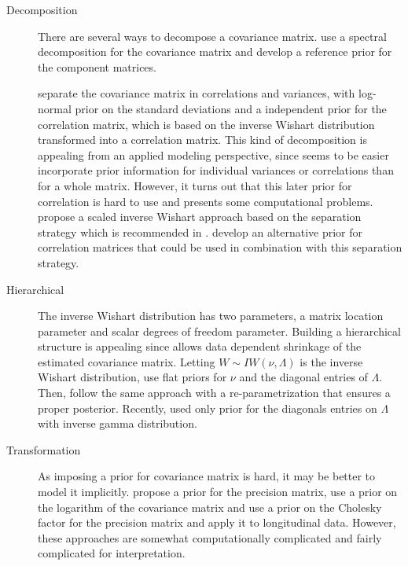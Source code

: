 \documentclass{article}
\begin{document}
\begin{description}
\item[Decomposition] There are several ways to decompose a covariance matrix.  \cite{yang1994} use a spectral decomposition for the covariance matrix and develop a reference prior for the component matrices. 

\cite{barnard2000} separate the covariance matrix in correlations and variances, with log-normal prior on the standard deviations and a independent prior for the correlation matrix, which is based on the inverse Wishart distribution transformed into a correlation matrix. This kind of decomposition is appealing from an applied modeling perspective, since seems to be easier incorporate prior information for individual variances or correlations than for a whole matrix. However, it turns out that this later prior for correlation is hard to use and presents some computational problems. \cite{SIW2008} propose a scaled inverse Wishart approach based on the separation strategy which is recommended in \cite{gelmanhill}. \cite{lewandowski2009generating} develop an alternative prior for correlation matrices that could be used in combination with this separation strategy. 

\item[Hierarchical] The inverse Wishart distribution has two parameters, a matrix location parameter and scalar degrees of freedom parameter.  Building a hierarchical structure is appealing since allows data dependent shrinkage of the estimated covariance matrix. Letting $W \sim IW(\nu,\Lambda)$ is the inverse Wishart distribution, \cite{daniels1999} use flat priors for $\nu$ and the diagonal entries of $\Lambda$. Then, \cite{matilde} follow the same approach with a re-parametrization that ensures a proper posterior.  Recently,  \cite{huang2013simple} used only prior for the diagonals entries on $\Lambda$ with inverse gamma distribution. 

\item[Transformation] As imposing a prior for covariance matrix is hard, it may be better to model it implicitly. \cite{wong2003} propose a prior for the precision matrix, \cite{leonard1992} use a prior on the logarithm of the covariance matrix and \cite{smith2002} use a prior on the Cholesky factor for the precision matrix and apply it to longitudinal data.
However, these approaches are somewhat computationally complicated and fairly complicated for interpretation. 
\end{description}
\end{document}
